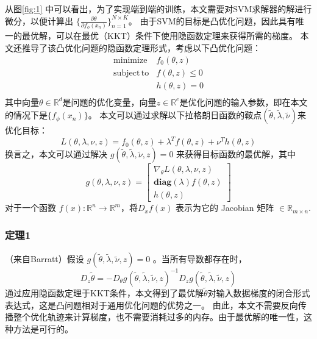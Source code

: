 从图\ref{fig:1} 中可以看出，为了实现端到端的训练，本文需要对SVM求解器的解进行微分，以便计算出
$\{\frac{\partial\theta}{\partial f_\phi(x_n)}\}^{N \times K}_{n=1}$。
由于SVM的目标是凸优化问题，因此具有唯一的最优解，可以在最优（KKT）条件下使用隐函数定理来获得所需的梯度。
本文还推导了该凸优化问题的隐函数定理形式，考虑以下凸优化问题：
\begin{equation}
    \label{equation:5}
    \begin{aligned}
        \mathrm{minimize} \; &f_0(\theta, z)\\
        \mathrm{subject\, to} &f(\theta, z) \le 0\\
        &h(\theta, z)=0\\
    \end{aligned}
\end{equation}
其中向量$\theta \in \mathbb{R}^d$是问题的优化变量，向量$z \in \mathbb{R}^e$是优化问题的输入参数，即在本文的情况下是$\{f_\phi(x_n)\}$。
本文可以通过求解以下拉格朗日函数的鞍点$(\tilde{\theta}, \tilde{\lambda}, \tilde{\nu})$来优化目标：
\begin{equation}
    \label{equation:6}
    L(\theta, \lambda, \nu, z) = f_0(\theta, z) + \lambda^{T} f(\theta, z) + \nu^Th(\theta, z)
\end{equation}
换言之，本文可以通过解决 $g(\tilde{\theta}, \tilde{\lambda}, \tilde{\nu}, z  ) = 0$ 来获得目标函数的最优解，其中
\begin{equation}
    \label{equation:7}
    g(\theta, \lambda, \nu, z ) = \left [
        \begin{array}{l}
            \nabla_\theta L(\theta, \lambda, \nu,z)\\
            \mathbf{diag}(\lambda)f(\theta, z)\\
            h(\theta, z)
        \end{array}
        \right ]
\end{equation}
对于一个函数 $f(x) : \mathbb{R}^n \rightarrow \mathbb{R}^m$，将$D_xf(x)$ 表示为它的 Jacobian 矩阵 $\in \mathbb{R}_{m\times n}$.

\subsubsection{定理1}
（来自Barratt）假设 $g(\tilde{\theta}, \tilde{\lambda}, \tilde{\nu}, z  ) = 0$ 。当所有导数都存在时，
\begin{equation}
    \label{equation:8}
    D_z\tilde{\theta} = -D_{\theta}g(\tilde{\theta}, \tilde{\lambda}, \tilde{\nu}, z)^{-1}D_zg(\tilde{\theta}, \tilde{\lambda}, \tilde{\nu}, z)
\end{equation}
通过应用隐函数定理于KKT条件，本文得到了最优解$\tilde{\theta}$对输入数据梯度的闭合形式表达式，这是凸问题相对于通用优化问题的优势之一。
由此，本文不需要反向传播整个优化轨迹来计算梯度，也不需要消耗过多的内存。由于最优解的唯一性，这种方法是可行的。


